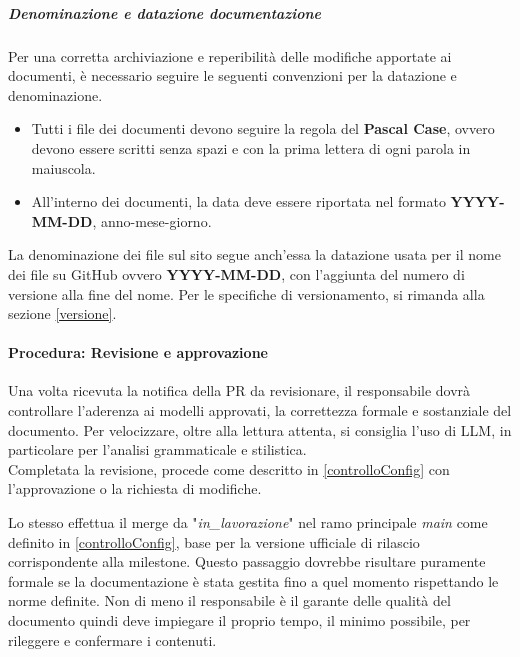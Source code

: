 \documentclass[a4paper,12pt]{article}
\begin{document}
\subparagraph{Denominazione e datazione documentazione}\label{convenzioniNomiDate}
Per una corretta archiviazione e reperibilità delle modifiche apportate ai
documenti, è necessario seguire le seguenti convenzioni per la datazione e
denominazione.
\begin{itemize}
    \item Tutti i file dei documenti devono seguire la regola del \textbf{Pascal Case},
          ovvero devono essere scritti senza spazi e con la prima lettera di ogni parola
          in maiuscola.
    \item All'interno dei documenti, la data deve essere riportata nel formato
          \textbf{YYYY-MM-DD}, anno-mese-giorno.
\end{itemize}
La denominazione dei file sul sito segue anch'essa la datazione usata per il nome dei file su GitHub ovvero \textbf{YYYY-MM-DD}, con l'aggiunta del numero di versione alla fine del nome. Per le specifiche di versionamento, si rimanda alla sezione \ref{versione}.

\paragraph{Procedura: Revisione e approvazione} \label{revisione_approvazione}

Una volta ricevuta la notifica della PR da revisionare, il responsabile dovrà
controllare l'aderenza ai modelli approvati, la correttezza formale e
sostanziale del documento. Per velocizzare, oltre alla lettura attenta, si
consiglia l'uso di LLM, in particolare per l'analisi grammaticale e stilistica.
\\Completata la revisione, procede come descritto in \ref{controlloConfig} con
l'approvazione o la richiesta di modifiche.

Lo stesso effettua il merge da "\textit{in\_lavorazione}" nel ramo principale
\textit{main} come definito in \ref{controlloConfig}, base per la versione
ufficiale di rilascio corrispondente alla milestone. Questo passaggio dovrebbe
risultare puramente formale se la documentazione è stata gestita fino a quel
momento rispettando le norme definite. Non di meno il responsabile è il garante
delle qualità del documento quindi deve impiegare il proprio tempo, il minimo
possibile, per rileggere e confermare i contenuti.
\end{document}
